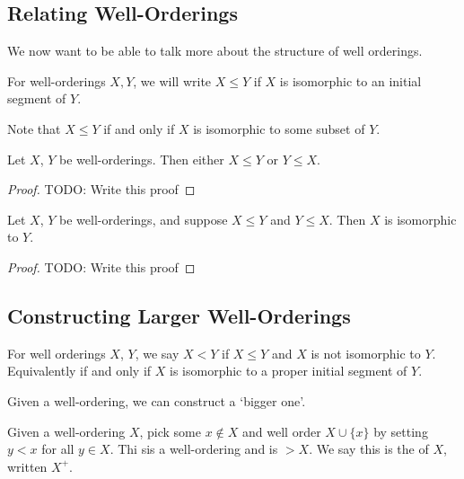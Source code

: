 \documentclass[a4paper]{scrartcl}
\begin{document}
\subsection{Relating Well-Orderings}

We now want to be able to talk more about the structure of well orderings.

\begin{definition}
  For well-orderings $X, Y$, we will write $X \leq Y$ if $X$ is isomorphic to an initial segment of $Y$.
\end{definition}

Note that $X \leq Y$ if and only if $X$ is isomorphic to some subset of $Y$. 

\begin{proposition}
  Let $X$, $Y$ be well-orderings. Then either $X \leq Y$ or $Y \leq X$.
\end{proposition}
\begin{proof}
  {\color{red} TODO: Write this proof}
\end{proof}

\begin{proposition}
  Let $X$, $Y$ be well-orderings, and suppose $X \leq Y$ and $Y \leq X$. Then $X$ is isomorphic to $Y$.
\end{proposition}
\begin{proof}
  {\color{red} TODO: Write this proof}
\end{proof}

\subsection{Constructing Larger Well-Orderings}

For well orderings $X$, $Y$, we say $X < Y$ if $X \leq Y$ and $X$ is not isomorphic to $Y$. Equivalently if and only if $X$ is isomorphic to a proper initial segment of $Y$.

Given a well-ordering, we can construct a `bigger one'.

\begin{definition}[Successor]
  Given a well-ordering $X$, pick some $x \not \in X$ and well order $X \cup \{x\}$ by setting $y < x$ for all $y \in X$. Thi sis a well-ordering and is $> X$. We say this is the  of $X$, written $X^+$.  
\end{definition}
\end{document}
